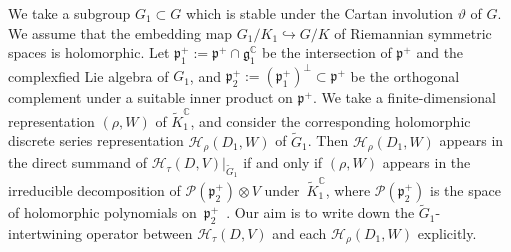 \documentclass[pdftex]{sigma}
\numberwithin{equation}{section}
\newcommand{\BC}{\mathbb{C}}
\newcommand{\fg}{\mathfrak{g}}
\newcommand{\fp}{\mathfrak{p}}
\newcommand{\cH}{\mathcal{H}}
\newcommand{\cP}{\mathcal{P}}
\begin{document}
We take a subgroup $G_1\subset G$ which is stable under the Cartan involution $\vartheta$ of $G$. We assume that the embedding map $G_1/K_1\hookrightarrow G/K$ of Riemannian symmetric spaces is holomorphic. Let $\fp^+_1:=\fp^+\cap\fg^\BC_1$ be the intersection of $\fp^+$ and the complexfied Lie algebra of $G_1$, and $\fp^+_2:=(\fp^+_1)^\bot\subset\fp^+$ be the orthogonal complement under a suitable inner product on $\fp^+$. We take a finite-dimensional representation $(\rho,W)$ of $\tilde{K}_1^\BC$, and consider the corresponding holomorphic discrete series representation $\cH_{\rho}(D_1,W)$ of $\tilde{G}_1$. Then $\cH_{\rho}(D_1,W)$ appears in the direct summand of $\cH_{\tau}(D,V)|_{\tilde{G}_1}$ if and only if $(\rho,W)$ appears in the irreducible decomposition of $\cP(\fp^+_2)\otimes V$ under~$\tilde{K}_1^\BC$, where $\cP(\fp^+_2)$ is the space of holomorphic polynomials on~$\fp^+_2$~\cite{Kmf1}. Our aim is to write down the $\tilde{G}_1$-intertwining operator between $\cH_{\tau}(D,V)$ and each $\cH_{\rho}(D_1,W)$ explicitly.
\end{document}
